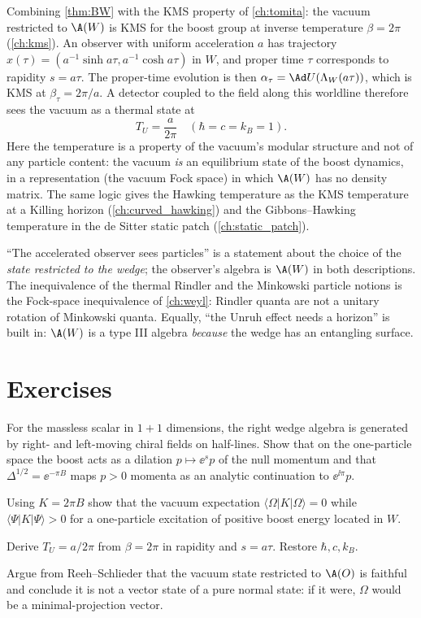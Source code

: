 Combining \cref{thm:BW} with the KMS property of \cref{ch:tomita}: the vacuum restricted to $\A(W)$ is KMS for the boost group at inverse temperature $\beta=2\pi$ (\cref{ch:kms}). An observer with uniform acceleration $a$ has trajectory $x(\tau)=(a^{-1}\sinh a\tau,a^{-1}\cosh a\tau)$ in $W$, and proper time $\tau$ corresponds to rapidity $s=a\tau$. The proper-time evolution is then $\alpha_\tau=\Ad U(\Lambda_W(a\tau))$, which is KMS at $\beta_\tau=2\pi/a$. A detector coupled to the field along this worldline therefore sees the vacuum as a thermal state at
\begin{equation}
T_U=\frac{a}{2\pi}\quad(\hbar=c=k_B=1).
\end{equation}
Here the temperature is a property of the vacuum's modular structure and not of any particle content: the vacuum \emph{is} an equilibrium state of the boost dynamics, in a representation (the vacuum Fock space) in which $\A(W)$ has no density matrix. The same logic gives the Hawking temperature as the KMS temperature at a Killing horizon (\cref{ch:curved_hawking}) and the Gibbons--Hawking temperature in the de Sitter static patch (\cref{ch:static_patch}).

\begin{whatwrong}
``The accelerated observer sees particles'' is a statement about the choice of the \emph{state restricted to the wedge}; the observer's algebra is $\A(W)$ in both descriptions. The inequivalence of the thermal Rindler and the Minkowski particle notions is the Fock-space inequivalence of \cref{ch:weyl}: Rindler quanta are not a unitary rotation of Minkowski quanta. Equally, ``the Unruh effect needs a horizon'' is built in: $\A(W)$ is a type III algebra \emph{because} the wedge has an entangling surface.
\end{whatwrong}

\section*{Exercises}
\begin{exercise}
For the massless scalar in $1+1$ dimensions, the right wedge algebra is generated by right- and left-moving chiral fields on half-lines. Show that on the one-particle space the boost acts as a dilation $p\mapsto\ee^{s}p$ of the null momentum and that $\Delta^{1/2}=\ee^{-\pi B}$ maps $p>0$ momenta as an analytic continuation to $\ee^{\ii\pi}p$.
\end{exercise}
\begin{exercise}
Using $K=2\pi B$ show that the vacuum expectation $\langle\Omega|K|\Omega\rangle=0$ while $\langle\Psi|K|\Psi\rangle>0$ for a one-particle excitation of positive boost energy located in $W$.
\end{exercise}
\begin{exercise}
Derive $T_U=a/2\pi$ from $\beta=2\pi$ in rapidity and $s=a\tau$. Restore $\hbar,c,k_B$.
\end{exercise}
\begin{exercise}
Argue from Reeh--Schlieder that the vacuum state restricted to $\A(O)$ is faithful and conclude it is not a vector state of a pure normal state: if it were, $\Omega$ would be a minimal-projection vector.
\end{exercise}
